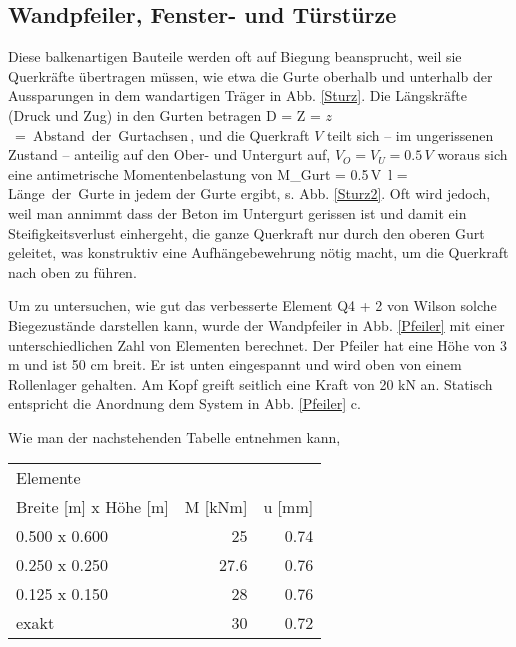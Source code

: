 {{\textcolor{sectionTitleBlue}{\subsection{Wandpfeiler, Fenster- und T\"{u}rst\"{u}rze}}}
Diese balkenartigen Bauteile werden oft auf Biegung beansprucht, weil sie Querkr\"{a}fte \"{u}bertragen m\"{u}ssen, wie etwa die Gurte oberhalb und unterhalb der Aussparungen in dem wandartigen Tr\"{a}ger in Abb. \ref{Sturz}. Die L\"{a}ngskr\"{a}fte (Druck und Zug) in den Gurten betragen
\bfo
D = Z =  \qquad \mbox{$z$ = Abstand der Gurtachsen}\,,
\efo
und die Querkraft $V$ teilt sich -- im ungerissenen Zustand -- anteilig auf den Ober- und Untergurt auf, $V_O = V_U = 0.5\,V$ woraus sich eine antimetrische Momentenbelastung von
\bfo
M_{\mbox{\small Gurt}} = 0.5\,V\, \qquad l = \mbox{L\"{a}nge der Gurte}
\efo
in jedem der Gurte ergibt, s. Abb. \ref{Sturz2}. Oft wird jedoch, weil man annimmt dass der Beton im Untergurt gerissen ist und damit ein Steifigkeitsverlust einhergeht, die ganze Querkraft nur durch den oberen Gurt geleitet, was konstruktiv eine Aufh\"{a}ngebewehrung n\"{o}tig macht, um die Querkraft nach oben zu f\"{u}hren.

Um zu untersuchen, wie gut das verbesserte Element Q4 + 2 von Wilson solche Biegezust\"{a}nde darstellen kann, wurde der Wandpfeiler in Abb. \ref{Pfeiler} mit einer unterschiedlichen Zahl von Elementen berechnet. Der Pfeiler hat eine H\"{o}he von 3 m und ist 50 cm breit. Er ist unten eingespannt und wird oben von einem Rollenlager gehalten. Am Kopf greift seitlich eine Kraft von 20 kN an. Statisch entspricht die Anordnung dem System in Abb. \ref{Pfeiler} c.



{\noindent Wie} man der nachstehenden Tabelle entnehmen kann,\\

\begin{tabular}{lrr}
\noalign{\hrule\smallskip}
  Elemente &            &            \\
Breite [m] x H\"{o}he [m] &   M  [kNm] &     u [mm] \\
\noalign{\hrule\smallskip}
 0.500 x 0.600 &         25 &       0.74 \\
0.250 x 0.250 &       27.6 &       0.76 \\
0.125 x 0.150 &         28 &       0.76 \\
\noalign{\hrule\smallskip}
     exakt &         30 &       0.72 \\
\end{tabular}\\

}
